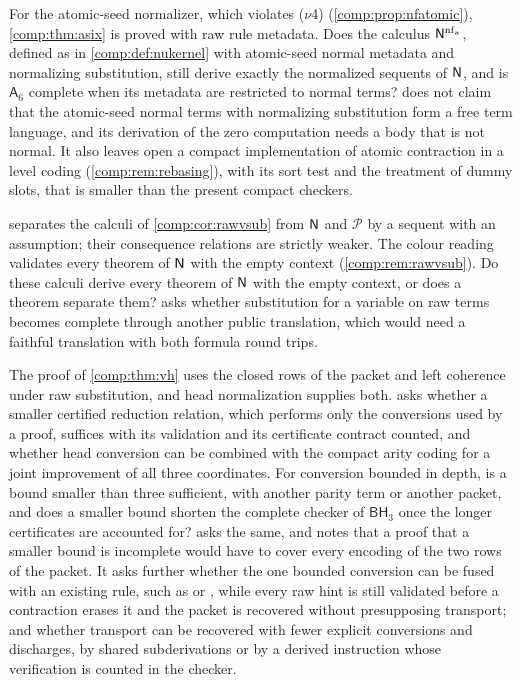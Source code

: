 \begin{question}
For the atomic-seed normalizer, which violates ($\nu$4)
(\cref{comp:prop:nfatomic}), \cref{comp:thm:asix} is proved with raw rule
metadata. Does the calculus $\mathsf{N}^{\operatorname{nf}_{\mathrm a}}$, defined as in
\cref{comp:def:nukernel} with atomic-seed normal metadata and normalizing
substitution, still derive exactly the normalized sequents of $\mathsf{N}$, and is
$\mathsf{A}_6$ complete when its metadata are restricted to normal terms?
 does not claim that the atomic-seed normal
terms with normalizing substitution form a free term language, and its
derivation of the zero computation needs a body that is not normal. It also
leaves open a compact implementation of atomic contraction in a level coding
(\cref{comp:rem:rebasing}), with its sort test and the treatment of dummy
slots, that is smaller than the present compact checkers.
\end{question}

\begin{question}
 separates the calculi of \cref{comp:cor:rawvsub}
from $\mathsf{N}$ and $\mathcal P$ by a sequent with an assumption; their
consequence relations are strictly weaker. The colour reading validates
every theorem of $\mathsf{N}$ with the empty context (\cref{comp:rem:rawvsub}).
Do these calculi derive every theorem of $\mathsf{N}$ with the empty context, or
does a theorem separate them?  asks whether
substitution for a variable on raw terms becomes complete through another
public translation, which would need a faithful translation with both
formula round trips.
\end{question}

\begin{question}
The proof of \cref{comp:thm:vh} uses the closed rows of the packet and left
coherence under raw substitution, and head normalization supplies both.
 asks whether a smaller certified reduction relation,
which performs only the conversions used by a proof, suffices with its
validation and its certificate contract counted, and whether head conversion
can be combined with the compact arity coding for a joint improvement of all
three coordinates. For conversion bounded in depth, is a bound smaller than
three sufficient, with another parity term or another packet, and does a
smaller bound shorten the complete checker of $\mathsf{BH}_3$ once the
longer certificates are accounted for?  asks the
same, and notes that a proof that a smaller bound is incomplete would have to
cover every encoding of the two rows of the packet. It asks further whether
the one bounded conversion can be fused with an existing rule, such as
 or , while every raw hint is still validated
before a contraction erases it and the packet is recovered without
presupposing transport; and whether transport can be recovered with fewer
explicit conversions and discharges, by shared subderivations or by a
derived instruction whose verification is counted in the checker.
\end{question}

